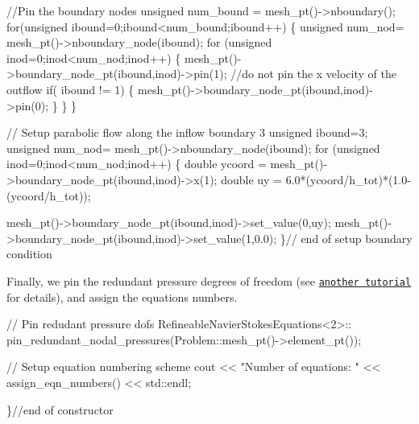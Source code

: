 \begin{DoxyCodeInclude}


 \textcolor{comment}{//Pin the boundary nodes}
 \textcolor{keywordtype}{unsigned} num\_bound = mesh\_pt()->nboundary();
 \textcolor{keywordflow}{for}(\textcolor{keywordtype}{unsigned} ibound=0;ibound<num\_bound;ibound++)
  \{
   \textcolor{keywordtype}{unsigned} num\_nod= mesh\_pt()->nboundary\_node(ibound);
   \textcolor{keywordflow}{for} (\textcolor{keywordtype}{unsigned} inod=0;inod<num\_nod;inod++)
    \{
      mesh\_pt()->boundary\_node\_pt(ibound,inod)->pin(1);
      \textcolor{comment}{//do not pin the x velocity of the outflow}
      \textcolor{keywordflow}{if}( ibound != 1)
      \{
       mesh\_pt()->boundary\_node\_pt(ibound,inod)->pin(0); 
      \}     
    \}
  \}
 
 \textcolor{comment}{// Setup parabolic flow along the inflow boundary 3}
 \textcolor{keywordtype}{unsigned} ibound=3; 
 \textcolor{keywordtype}{unsigned} num\_nod= mesh\_pt()->nboundary\_node(ibound);
 \textcolor{keywordflow}{for} (\textcolor{keywordtype}{unsigned} inod=0;inod<num\_nod;inod++)
  \{
   \textcolor{keywordtype}{double} ycoord = mesh\_pt()->boundary\_node\_pt(ibound,inod)->x(1); 
   \textcolor{keywordtype}{double} uy = 6.0*(ycoord/h\_tot)*(1.0-(ycoord/h\_tot));

   mesh\_pt()->boundary\_node\_pt(ibound,inod)->set\_value(0,uy);
   mesh\_pt()->boundary\_node\_pt(ibound,inod)->set\_value(1,0.0);    
  \}\textcolor{comment}{// end of setup boundary condition}

\end{DoxyCodeInclude}


Finally, we pin the redundant pressure degrees of freedom (see \href{../../../navier_stokes/adaptive_driven_cavity/html/index.html}{\tt another tutorial} for details), and assign the equations numbers.


\begin{DoxyCodeInclude}
 
 \textcolor{comment}{// Pin redudant pressure dofs}
 RefineableNavierStokesEquations<2>::
  pin\_redundant\_nodal\_pressures(Problem::mesh\_pt()->element\_pt());
 
 \textcolor{comment}{// Setup equation numbering scheme}
 cout << \textcolor{stringliteral}{"Number of equations: "} << assign\_eqn\_numbers() << std::endl; 
 
\}\textcolor{comment}{//end of constructor}

\end{DoxyCodeInclude}




